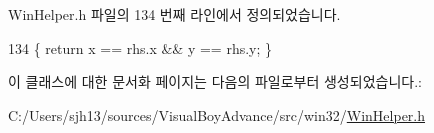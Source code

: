 Win\+Helper.\+h 파일의 134 번째 라인에서 정의되었습니다.


\begin{DoxyCode}
134 \{ \textcolor{keywordflow}{return} x == rhs.x && y == rhs.y; \}
\end{DoxyCode}


이 클래스에 대한 문서화 페이지는 다음의 파일로부터 생성되었습니다.\+:\begin{DoxyCompactItemize}
\item 
C\+:/\+Users/sjh13/sources/\+Visual\+Boy\+Advance/src/win32/\mbox{\hyperlink{_win_helper_8h}{Win\+Helper.\+h}}\end{DoxyCompactItemize}
